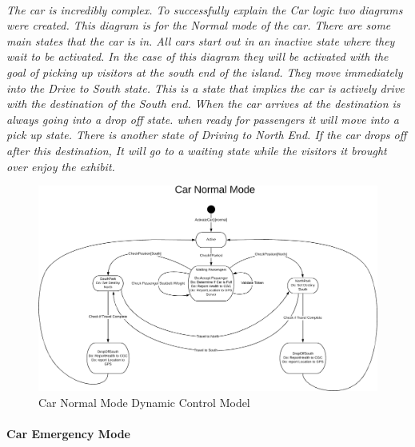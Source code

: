 \documentclass[12pt]{article}
\begin{document}
    \paragraph{}\textit{The car is incredibly complex. To successfully explain the Car logic two diagrams were created. This diagram is for the Normal mode of the car. There are some main states that the car is in. All cars start out in an inactive state where they wait to be activated. In the case of
    this diagram they will be activated with the goal of picking up visitors at the south end of the island. They move immediately into the Drive to South state. This is a state that implies the car is actively drive with the destination of the South end.
    When the car arrives at the destination is always going into a drop off state. when ready for passengers it will move into a pick up state. There is another state of Driving to North End. If the car drops off after this destination, It will go to a waiting state while the visitors it brought over enjoy the exhibit.}
    \begin{figure}[H]
         \centerline{\includegraphics[scale=0.60]{CarNormalMode.png}}
         \caption{Car Normal Mode Dynamic Control Model}
          \label{fig:carnormalmode}
    \end{figure}

    \paragraph{Car Emergency Mode}
\end{document}
